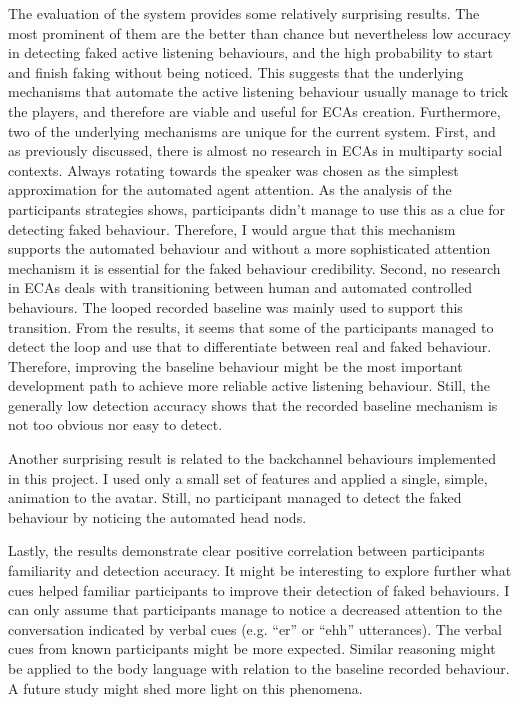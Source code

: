 \documentclass[]{simple-thesis}
\begin{document}
The evaluation of the system provides some relatively surprising results.
The most prominent of them are the better than chance but nevertheless low accuracy in detecting faked active listening behaviours, and the high probability to start and finish faking without being noticed.
This suggests that the underlying mechanisms that automate the active listening behaviour usually manage to trick the players, and therefore are viable and useful for ECAs creation.
Furthermore, two of the underlying mechanisms are unique for the current system.
First, and as previously discussed, there is almost no research in ECAs in multiparty social contexts.
Always rotating towards the speaker was chosen as the simplest approximation for the automated agent attention.
As the analysis of the participants strategies shows, participants didn't manage to use this as a clue for detecting faked behaviour.
Therefore, I would argue that this mechanism supports the automated behaviour and without a more sophisticated attention mechanism it is essential for the faked behaviour credibility.
Second, no research in ECAs deals with transitioning between human and automated controlled behaviours.
The looped recorded baseline was mainly used to support this transition.
From the results, it seems that some of the participants managed to detect the loop and use that to differentiate between real and faked behaviour.
Therefore, improving the baseline behaviour might be the most important development path to achieve more reliable active listening behaviour.
Still, the generally low detection accuracy shows that the recorded baseline mechanism is not too obvious nor easy to detect.

Another surprising result is related to the backchannel behaviours implemented in this project.
I used only a small set of features and applied a single, simple, animation to the avatar.
Still, no participant managed to detect the faked behaviour by noticing the automated head nods.

Lastly, the results demonstrate clear positive correlation between participants familiarity and detection accuracy.
It might be interesting to explore further what cues helped familiar participants to improve their detection of faked behaviours.
I can only assume that participants manage to notice a decreased attention to the conversation indicated by verbal cues (e.g. ``er'' or ``ehh'' utterances).
The verbal cues from known participants might be more expected.
Similar reasoning might be applied to the body language with relation to the baseline recorded behaviour.
A future study might shed more light on this phenomena.
\end{document}
